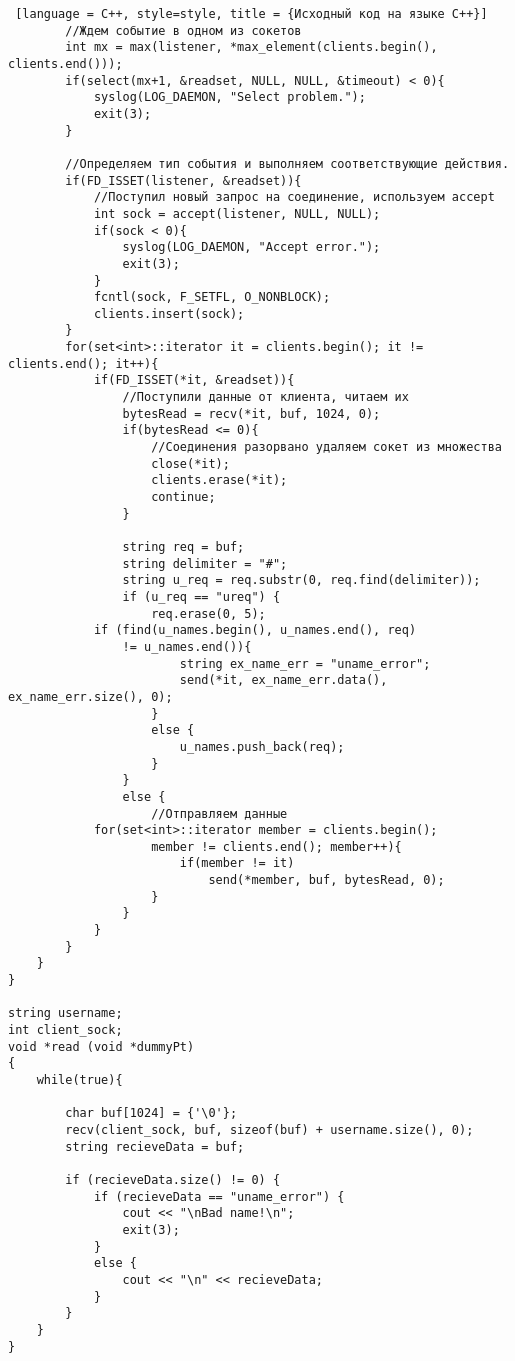\documentclass{article}
\begin{document}
\begin{lstlisting} [language = C++, style=style, title = {Исходный код на языке C++}]
        //Ждем событие в одном из сокетов
        int mx = max(listener, *max_element(clients.begin(), clients.end()));
        if(select(mx+1, &readset, NULL, NULL, &timeout) < 0){
            syslog(LOG_DAEMON, "Select problem.");
            exit(3);
        }

        //Определяем тип события и выполняем соответствующие действия.
        if(FD_ISSET(listener, &readset)){
            //Поступил новый запрос на соединение, используем accept
            int sock = accept(listener, NULL, NULL);
            if(sock < 0){
                syslog(LOG_DAEMON, "Accept error.");
                exit(3);
            }
            fcntl(sock, F_SETFL, O_NONBLOCK);
            clients.insert(sock);
        }
        for(set<int>::iterator it = clients.begin(); it != clients.end(); it++){
            if(FD_ISSET(*it, &readset)){
                //Поступили данные от клиента, читаем их
                bytesRead = recv(*it, buf, 1024, 0);
                if(bytesRead <= 0){
                    //Соединения разорвано удаляем сокет из множества
                    close(*it);
                    clients.erase(*it);
                    continue;
                }

                string req = buf;
                string delimiter = "#";
                string u_req = req.substr(0, req.find(delimiter));
                if (u_req == "ureq") {
                    req.erase(0, 5);
			if (find(u_names.begin(), u_names.end(), req)
				!= u_names.end()){
                        string ex_name_err = "uname_error";
                        send(*it, ex_name_err.data(), ex_name_err.size(), 0);
                    }
                    else {
                        u_names.push_back(req);
                    }
                }
                else {
                    //Отправляем данные
			for(set<int>::iterator member = clients.begin();
					member != clients.end(); member++){
                        if(member != it)
                            send(*member, buf, bytesRead, 0);
                    }
                }
            }
        }
    }
}

string username;
int client_sock;
void *read (void *dummyPt)
{
    while(true){

        char buf[1024] = {'\0'};
        recv(client_sock, buf, sizeof(buf) + username.size(), 0);
        string recieveData = buf;

        if (recieveData.size() != 0) {
            if (recieveData == "uname_error") {
                cout << "\nBad name!\n";
                exit(3);
            }
            else {
                cout << "\n" << recieveData;
            }
        }
    }
}


\end{lstlisting}
\end{document}
